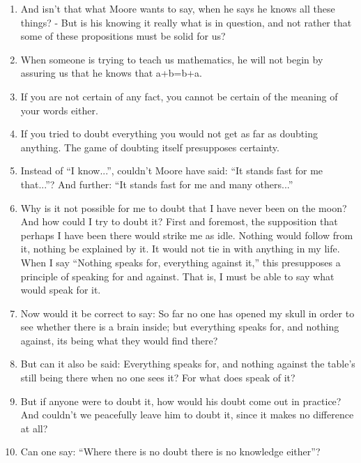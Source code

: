 \documentclass{book}
\begin{document}
\begin{enumerate}
\item
And isn't that what Moore wants to say, when he says he knows all these things?
- But is his knowing it really what is in question, and not rather that some of
these propositions must be solid for us?

\item
When someone is trying to teach us mathematics, he will not begin by assuring
us that he knows that a+b=b+a.

\item
If you are not certain of any fact, you cannot be certain of the meaning of
your words either.

\item
If you tried to doubt everything you would not get as far as doubting anything.
The game of doubting itself presupposes certainty.

\item
Instead of ``I know...'', couldn't Moore have said: ``It stands fast for me
that...''? And further: ``It stands fast for me and many others...''

\item
Why is it not possible for me to doubt that I have never been on the moon? And
how could I try to doubt it?  First and foremost, the supposition that perhaps
I have been there would strike me as idle. Nothing would follow from it,
nothing be explained by it. It would not tie in with anything in my life.  When
I say ``Nothing speaks for, everything against it,'' this presupposes a
principle of speaking for and against. That is, I must be able to say what
would speak for it.

\item
Now would it be correct to say: So far no one has opened my skull in order to
see whether there is a brain inside; but everything speaks for, and nothing
against, its being what they would find there?

\item
But can it also be said: Everything speaks for, and nothing against the table's
still being there when no one sees it? For what does speak of it?

\item
But if anyone were to doubt it, how would his doubt come out in practice? And
couldn't we peacefully leave him to doubt it, since it makes no difference at
all?

\item
Can one say: ``Where there is no doubt there is no knowledge either''?


\end{enumerate}
\end{document}
